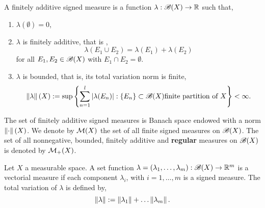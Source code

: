 A finitely additive signed measure is a function $\lambda:\mathscr{B}(X)\rightarrow \mathbb{R}$ such that, 
\begin{enumerate}
	\item $\lambda(\emptyset)=0$,
	\item $\lambda$ is finitely additive, that is ,
	\begin{equation*}
		\lambda(E_1\cup E_2)=\lambda(E_1)+\lambda(E_2)
	\end{equation*}
	for all $E_1, E_2\in \mathscr{B}(X)$ with $E_1\cap E_2=\emptyset$. 
	\item $\lambda$ is bounded, that is, its total variation norm is finite,
	\begin{equation}
		\left\|\lambda\right\|(X):=\sup\left\lbrace \sum_{n=1}^{l}\left| \lambda(E_n) \right|: \left\lbrace E_n \right\rbrace\subset \mathscr{B}(X) \text{finite partition of } X \right\rbrace<\infty.
	\end{equation}
\end{enumerate}
The set of finitely additive signed measures is Banach space endowed with a norm $\left\|\cdot\right\|(X)$. 
We denote by $\mathcal{M}(X)$ the set of all finite signed measures on $\mathscr{B}(X)$.  The set of all nonnegative, bounded, finitely additive  and \textbf{regular} measures on $\mathscr{B}(X)$ is denoted by $\mathcal{M}_+(X)$. 

\begin{definition}
	Let $X$ a measurable space. A set function $\lambda=(\lambda_1, \dots, \lambda_m):\mathscr{B}(X)\to\mathbb{R}^m$ is a vectorial measure if each component $\lambda_i$, with $i=1,\dots,m$ is a signed measure. The total variation of $\lambda$ is defined by,
	\begin{equation*}
		\left\|\lambda\right\|:=\left\|\lambda_1\right\|+\dots\left\|\lambda_m\right\|.
	\end{equation*}
\end{definition}

